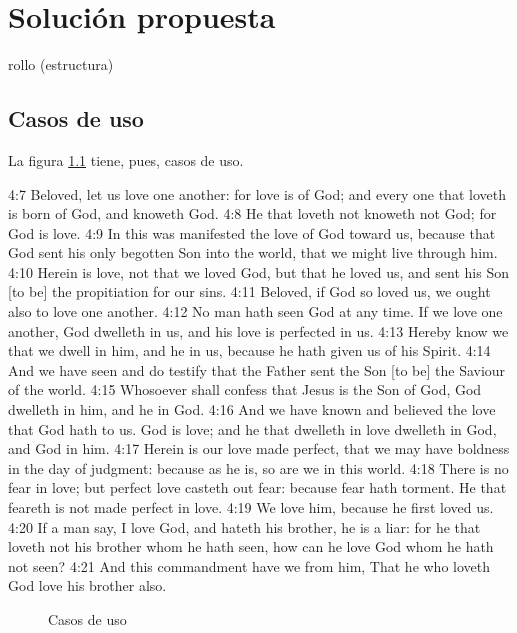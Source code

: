 \chapter{Soluci\'{o}n propuesta}
\label{propuesta}

rollo (estructura)

\section{Casos de uso}
\label{casosDeUso}

La figura \ref{casosDeUso} tiene, pues, casos de uso.


   {4:7} Beloved, let us love one another: for love is of God; and
every one that loveth is born of God, and knoweth God. {4:8} He that
loveth not knoweth not God; for God is love. {4:9} In this was
manifested the love of God toward us, because that God sent his only
begotten Son into the world, that we might live through him. {4:10}
Herein is love, not that we loved God, but that he loved us, and sent
his Son [to be] the propitiation for our sins. {4:11} Beloved, if God
so loved us, we ought also to love one another. {4:12} No man hath seen
God at any time. If we love one another, God dwelleth in us, and his
love is perfected in us. {4:13} Hereby know we that we dwell in him,
and he in us, because he hath given us of his Spirit. {4:14} And we
have seen and do testify that the Father sent the Son [to be] the
Saviour of the world. {4:15} Whosoever shall confess that Jesus is the
Son of God, God dwelleth in him, and he in God. {4:16} And we have
known and believed the love that God hath to us. God is love; and he
that dwelleth in love dwelleth in God, and God in him. {4:17} Herein is
our love made perfect, that we may have boldness in the day of
judgment: because as he is, so are we in this world. {4:18} There is no
fear in love; but perfect love casteth out fear: because fear hath
torment. He that feareth is not made perfect in love. {4:19} We love
him, because he first loved us. {4:20} If a man say, I love God, and
hateth his brother, he is a liar: for he that loveth not his brother
whom he hath seen, how can he love God whom he hath not seen? {4:21}
And this commandment have we from him, That he who loveth God love his
brother also.

\begin{figure}[t]
\begin{center}
\end{center}
\caption{Casos de uso}
\label{casosDeUso}
\end{figure}


